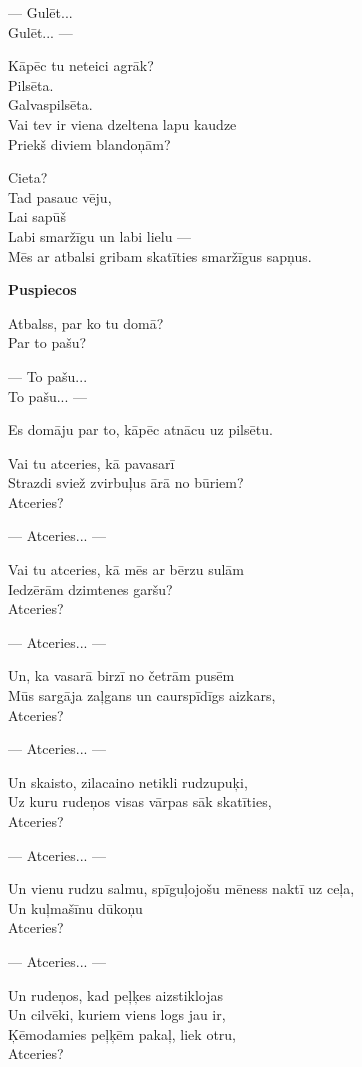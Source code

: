 \documentclass[14pt]{extarticle}
\begin{document}
--- Gulēt...\\
Gulēt... ---

Kāpēc tu neteici agrāk?\\
Pilsēta.\\
Galvaspilsēta.\\
Vai tev ir viena dzeltena lapu kaudze\\
Priekš diviem blandoņām?

Cieta?\\
Tad pasauc vēju,\\
Lai sapūš\\
Labi smaržīgu un labi lielu ---\\
Mēs ar atbalsi gribam skatīties smaržīgus sapņus.



\newpage

{\bf Puspiecos}

Atbalss, par ko tu domā?\\
Par to pašu?

--- To pašu...\\
To pašu... ---

Es domāju par to, kāpēc atnācu uz pilsētu.

Vai tu atceries, kā pavasarī\\
Strazdi sviež zvirbuļus ārā no būriem?\\
Atceries?

--- Atceries... ---

Vai tu atceries, kā mēs ar bērzu sulām\\
Iedzērām dzimtenes garšu?\\
Atceries?

--- Atceries... ---

Un, ka vasarā birzī no četrām pusēm\\
Mūs sargāja zaļgans un caurspīdīgs aizkars,\\
Atceries?

--- Atceries... ---

Un skaisto, zilacaino netikli rudzupuķi,\\
Uz kuru rudeņos visas vārpas sāk skatīties,\\
Atceries?

--- Atceries... ---

Un vienu rudzu salmu, spīguļojošu mēness naktī uz ceļa,\\
Un kuļmašīnu dūkoņu\\
Atceries?

--- Atceries... ---

Un rudeņos, kad peļķes aizstiklojas\\
Un cilvēki, kuriem viens logs jau ir,\\
Ķēmodamies peļķēm pakaļ, liek otru,\\
Atceries?
\end{document}
